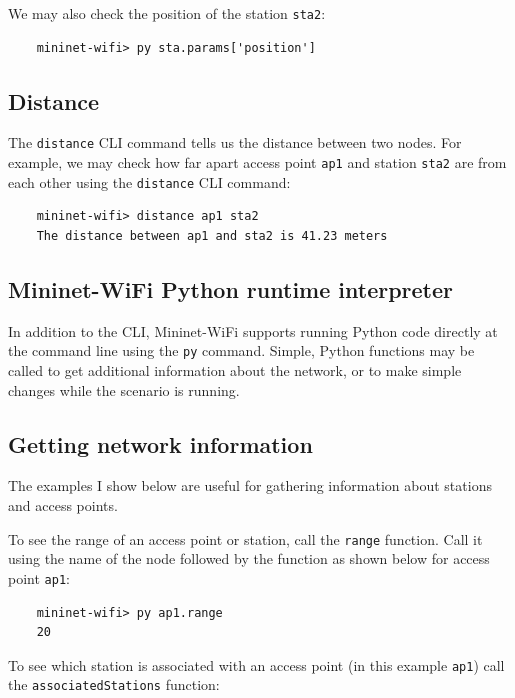 We may also check the position of the station \texttt{sta2}:

\begin{verbatim}
    mininet-wifi> py sta.params['position']
\end{verbatim}
  
\subsection{Distance}

The \texttt{distance} CLI command tells us the distance between two nodes. For example, we may check how far apart access point \texttt{ap1} and station \texttt{sta2} are from each other using the \texttt{distance} CLI command:

\begin{verbatim}
    mininet-wifi> distance ap1 sta2        
    The distance between ap1 and sta2 is 41.23 meters
\end{verbatim}
       
\subsection{Mininet-WiFi Python runtime interpreter}

In addition to the CLI, Mininet-WiFi supports running Python code directly at the command line using the \texttt{py} command. Simple, Python functions may be called to get additional information about the network, or to make simple changes while the scenario is running.

\subsection{Getting network information}

The examples I show below are useful for gathering information about stations and access points.

To see the range of an access point or station, call the \texttt{range} function. Call it using the name of the node followed by the function as shown below for access point \texttt{ap1}:

\begin{verbatim}
    mininet-wifi> py ap1.range
    20
\end{verbatim}
    
\noindent To see which station is associated with an access point (in this example \texttt{ap1}) call the \texttt{associatedStations} function:

